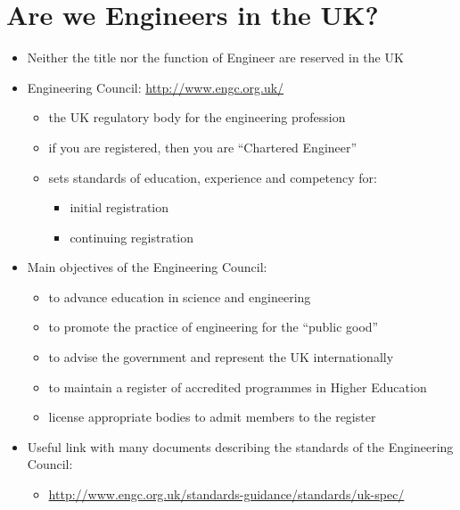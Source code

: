 \documentclass{article}
\begin{document}
\section{Are we Engineers in the UK?}
\begin{itemize}
\item Neither the title nor the function of Engineer are reserved in the UK
\item Engineering Council:   \url{http://www.engc.org.uk/}
\begin{itemize}
\item the UK regulatory body for the engineering profession 
\item if you are registered, then you are ``Chartered Engineer''
\item sets standards of education, experience and competency for:
\begin{itemize}
\item initial registration
\item continuing registration
\end{itemize}
\end{itemize}

\item Main objectives of the Engineering Council:
\begin{itemize}
\item to advance education in science and engineering
\item to promote the practice of engineering for the ``public good''
\item to advise the government and represent the UK internationally
\item to maintain a register of accredited programmes in Higher Education
\item license appropriate bodies to admit members to the register
\end{itemize}
\item Useful link with many documents describing the standards of the Engineering Council:
\begin{itemize}
\item \url{http://www.engc.org.uk/standards-guidance/standards/uk-spec/}
\end{itemize}
\end{itemize}
\end{document}
